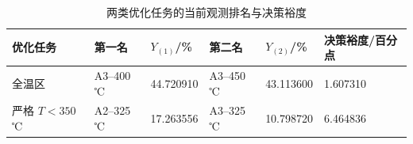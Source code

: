 \begin{table}[H]
  \centering
  \caption{两类优化任务的当前观测排名与决策裕度}
  \label{tab:q4-initial-rankings}
  \small
  \begin{tabularx}{\textwidth}{L{0.17\textwidth}C{0.16\textwidth}C{0.13\textwidth}C{0.16\textwidth}C{0.13\textwidth}C{0.15\textwidth}}
    \toprule
    优化任务 & 第一名 & $Y_{(1)}$/\% & 第二名 & $Y_{(2)}$/\% & 决策裕度/百分点 \\
    \midrule
    全温区 & A3--400 ℃ & 44.720910 & A3--450 ℃ & 43.113600 & 1.607310 \\
    严格 $T<350$ ℃ & A2--325 ℃ & 17.263556 & A3--325 ℃ & 10.798720 & 6.464836 \\
    \bottomrule
  \end{tabularx}
\end{table}
